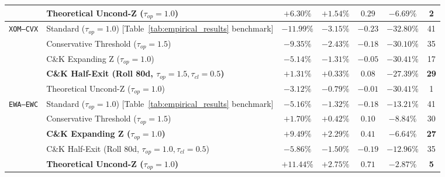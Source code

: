 \documentclass[11pt, a4paper]{article}
\begin{document}
\begin{table}[h!]
\begin{tabular}{lp{6.4cm}ccccc}
                 & Theoretical Uncond-Z ($\tau_{op}=1.0$)                      & $+6.30\%$ & $+1.54\%$ & $0.29$ & $-6.69\%$ & 2 \\
\midrule
\texttt{XOM--CVX}& Standard ($\tau_{op}=1.0$) [Table~\ref{tab:empirical_results} benchmark] & $-11.99\%$ & $-3.15\%$ & $-0.23$ & $-32.80\%$ & 41 \\
                 & Conservative Threshold ($\tau_{op}=1.5$)                    & $-9.35\%$ & $-2.43\%$ & $-0.18$ & $-30.10\%$ & 35 \\
                 & C\&K Expanding Z ($\tau_{op}=1.0$)                          & $-5.14\%$ & $-1.31\%$ & $-0.05$ & $-30.41\%$ & 17 \\
                 & \textbf{C\&K Half-Exit (Roll 80d, $\tau_{op}=1.5, \tau_{cl}=0.5$)} & $\mathbf{+1.31\%}$ & $\mathbf{+0.33\%}$ & $\mathbf{0.08}$ & $\mathbf{-27.39\%}$ & \textbf{29} \\
                 & Theoretical Uncond-Z ($\tau_{op}=1.0$)                      & $-3.12\%$ & $-0.79\%$ & $-0.01$ & $-30.41\%$ & 1 \\
\midrule
\texttt{EWA--EWC}& Standard ($\tau_{op}=1.0$) [Table~\ref{tab:empirical_results} benchmark] & $-5.16\%$ & $-1.32\%$ & $-0.18$ & $-13.21\%$ & 41 \\
                 & Conservative Threshold ($\tau_{op}=1.5$)                    & $+1.70\%$ & $+0.42\%$ & $0.10$ & $-8.84\%$  & 30 \\
                 & \textbf{C\&K Expanding Z ($\tau_{op}=1.0$)}                 & $\mathbf{+9.49\%}$ & $\mathbf{+2.29\%}$ & $\mathbf{0.41}$ & $\mathbf{-6.64\%}$  & \textbf{27} \\
                 & C\&K Half-Exit (Roll 80d, $\tau_{op}=1.0, \tau_{cl}=0.5$)   & $-5.86\%$ & $-1.50\%$ & $-0.19$ & $-12.96\%$ & 35 \\
                 & \textbf{Theoretical Uncond-Z ($\tau_{op}=1.0$)}            & $\mathbf{+11.44\%}$ & $\mathbf{+2.75\%}$ & $\mathbf{0.71}$ & $\mathbf{-2.87\%}$ & \textbf{5} \\
\bottomrule
\end{tabular}
\end{table}
\end{document}

